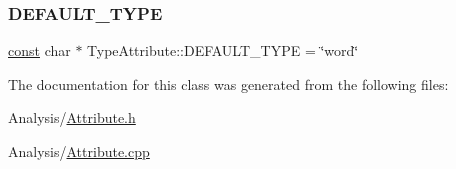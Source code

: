 \subsubsection{\texorpdfstring{D\+E\+F\+A\+U\+L\+T\+\_\+\+T\+Y\+PE}{DEFAULT\_TYPE}}
{\footnotesize\ttfamily \mbox{\hyperlink{ZlibCrc32_8h_a2c212835823e3c54a8ab6d95c652660e}{const}} char $\ast$ Type\+Attribute\+::\+D\+E\+F\+A\+U\+L\+T\+\_\+\+T\+Y\+PE = \char`\"{}word\char`\"{}\hspace{0.3cm}{\ttfamily [static]}}



The documentation for this class was generated from the following files\+:\begin{DoxyCompactItemize}
\item 
Analysis/\mbox{\hyperlink{Analysis_2Attribute_8h}{Attribute.\+h}}\item 
Analysis/\mbox{\hyperlink{Analysis_2Attribute_8cpp}{Attribute.\+cpp}}\end{DoxyCompactItemize}
